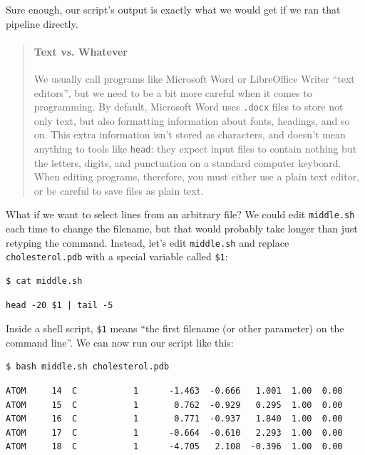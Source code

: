 \documentclass{book}
\begin{document}
Sure enough, our script's output is exactly what we would get if we ran
that pipeline directly.

\begin{quote}
\mbox{}\paragraph{Text vs. Whatever}

We usually call programs like Microsoft Word or LibreOffice Writer
``text editors'', but we need to be a bit more careful when it comes to
programming. By default, Microsoft Word uses \texttt{.docx} files to
store not only text, but also formatting information about fonts,
headings, and so on. This extra information isn't stored as characters,
and doesn't mean anything to tools like \texttt{head}: they expect input
files to contain nothing but the letters, digits, and punctuation on a
standard computer keyboard. When editing programs, therefore, you must
either use a plain text editor, or be careful to save files as plain
text.
\end{quote}

What if we want to select lines from an arbitrary file? We could edit
\texttt{middle.sh} each time to change the filename, but that would
probably take longer than just retyping the command. Instead, let's edit
\texttt{middle.sh} and replace \texttt{cholesterol.pdb} with a special
variable called \texttt{\$1}:

\begin{verbatim}
$ cat middle.sh
\end{verbatim}

\begin{verbatim}
head -20 $1 | tail -5
\end{verbatim}

Inside a shell script, \texttt{\$1} means ``the first filename (or other
parameter) on the command line''. We can now run our script like this:

\begin{verbatim}
$ bash middle.sh cholesterol.pdb
\end{verbatim}

\begin{verbatim}
ATOM     14  C           1      -1.463  -0.666   1.001  1.00  0.00
ATOM     15  C           1       0.762  -0.929   0.295  1.00  0.00
ATOM     16  C           1       0.771  -0.937   1.840  1.00  0.00
ATOM     17  C           1      -0.664  -0.610   2.293  1.00  0.00
ATOM     18  C           1      -4.705   2.108  -0.396  1.00  0.00
\end{verbatim}
\end{document}
